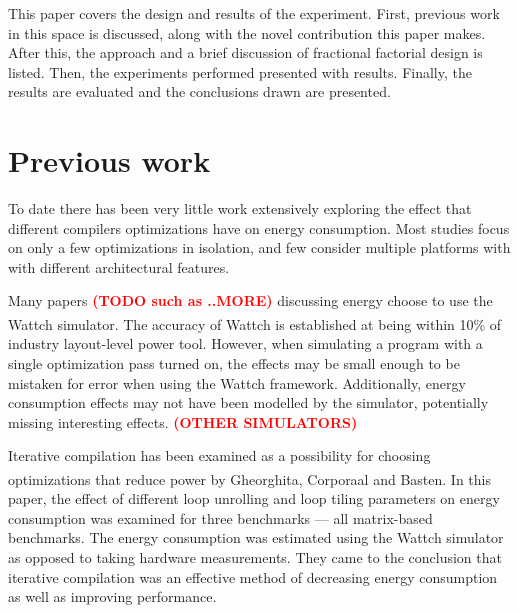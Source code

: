 \documentclass[twocolumn]{article}
\newcommand{\todo}[1]{\textbf{\textcolor{red}{#1}}}
\let\oldcite\cite
\renewcommand{\cite}[1]{\textsuperscript{\oldcite{#1}}}
\begin{document}

This paper covers the design and results of the experiment. First, previous work in this space is discussed, along with the novel contribution this paper makes. After this, the approach and a brief discussion of fractional factorial design is listed. Then, the experiments performed presented with results. Finally, the results are evaluated and the conclusions drawn are presented.

\section*{Previous work}

To date there has been very little work extensively exploring the effect that different compilers optimizations have on energy consumption. Most studies focus on only a few optimizations in isolation, and few consider multiple platforms with with different architectural features.

Many papers \todo{(TODO such as ..MORE)} discussing energy choose to use the Wattch simulator\cite{Wattch}. The accuracy of Wattch is established at being within 10\% of industry layout-level power tool. However, when simulating a program with a single optimization pass turned on, the effects may be small enough to be mistaken for error when using the Wattch framework. Additionally, energy consumption effects may not have been modelled by the simulator, potentially missing interesting effects. \todo{(OTHER SIMULATORS)}

Iterative compilation has been examined as a possibility for choosing optimizations that reduce power by Gheorghita, Corporaal and Basten\cite{IterativeCompilationForEnergy}. In this paper, the effect of different loop unrolling and loop tiling parameters on energy consumption was examined for three benchmarks --- all matrix-based benchmarks. The energy consumption was estimated using the Wattch simulator as opposed to taking hardware measurements. They came to the conclusion that iterative compilation was an effective method of decreasing energy consumption as well as improving performance.
\end{document}
